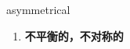 
\begin{frame}
{\huge asymmetrical}
\begin{center}
\begin{enumerate}\Large
  \item \textbf{不平衡的，不对称的}
\end{enumerate}
\end{center}
\end{frame}
